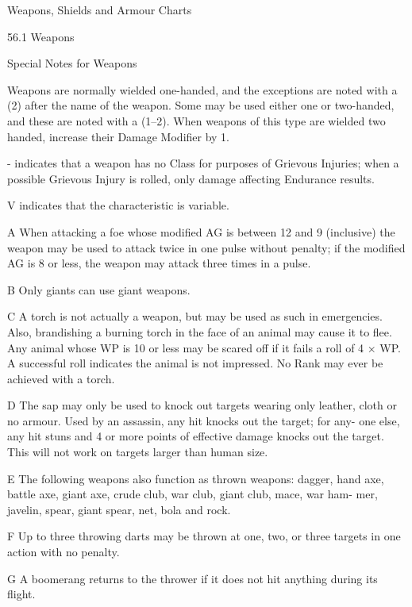 \begin{Table}{Weapons, Shields and Armour Charts}

56.1 Weapons 

Special Notes for Weapons 

 

Weapons  are  normally  wielded  one-handed,  and 
the  exceptions are  noted  with  a  (2)  after  the  name 
of  the  weapon.  Some  may  be  used  either  one  or 
two-handed,  and  these  are  noted  with  a  (1–2). 
When  weapons  of  this  type  are  wielded  two 
handed, increase their Damage Modifier by 1. 

- indicates that a weapon has no Class for purposes 
of  Grievous  Injuries;  when  a  possible  Grievous 
Injury  is  rolled,  only  damage  affecting  Endurance 
results. 

V indicates that the characteristic is variable. 

A  When  attacking  a  foe  whose  modified  AG  is 
between  12  and  9  (inclusive)  the  weapon  may  be 
used to attack twice in one pulse without penalty; if 
the  modified  AG  is  8  or  less,  the  weapon  may 
attack three times in a pulse. 

B Only giants can use giant weapons. 

C  A  torch  is  not  actually  a  weapon,  but  may  be 
used  as  such  in  emergencies.  Also,  brandishing  a 
burning torch in the face of an animal may cause it 
to flee. Any animal whose WP is 10 or less may be 
scared off if it fails a roll of 4 × WP. A successful 
roll indicates the animal is not impressed. No Rank 
may ever be achieved with a torch. 

D  The  sap  may  only  be  used  to  knock  out  targets 
wearing only leather, cloth or no armour. Used by 
an assassin, any hit knocks out the target; for any-
one  else,  any  hit  stuns  and  4  or  more  points  of 
effective  damage  knocks  out  the  target.  This  will 
not work on targets larger than human size. 

E  The  following  weapons  also  function  as  thrown 
weapons:  dagger,  hand  axe,  battle  axe,  giant  axe, 
crude  club,  war  club,  giant  club,  mace,  war  ham-
mer, javelin, spear, giant spear, net, bola and rock. 

F Up to three throwing darts may be thrown at one, 
two, or three targets in one action with no penalty. 

G A boomerang returns to the thrower if it does not 
hit anything during its flight. 


\end{Table}
